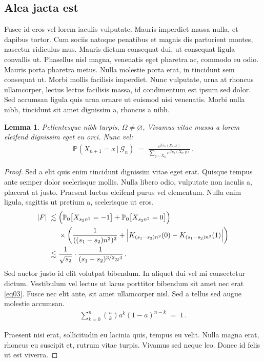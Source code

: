 \documentclass[reqno,final,11pt]{amsart}
\theoremstyle{plain}
\newtheorem{lemma}[theorem]{Lemma}
\theoremstyle{definition}
\theoremstyle{remark}
\begin{document}
\subsection{Alea jacta est}
Fusce id eros vel lorem iaculis vulputate. Mauris imperdiet massa nulla, et dapibus tortor. Cum sociis natoque penatibus et magnis dis parturient montes, nascetur ridiculus mus. Mauris dictum consequat dui, ut consequat ligula convallis ut. Phasellus nisl magna, venenatis eget pharetra ac, commodo eu odio. Mauris porta pharetra metus. Nulla molestie porta erat, in tincidunt sem consequat ut. Morbi mollis facilisis imperdiet. Nunc vulputate, urna at rhoncus ullamcorper, lectus lectus facilisis massa, id condimentum est ipsum sed dolor. Sed accumsan ligula quis urna ornare ut euismod nisi venenatis. Morbi nulla nibh, tincidunt sit amet dignissim a, rhoncus a nibh.
\begin{lemma}\label{lemma1}
 Pellentesque nibh turpis, $\Omega \neq \varnothing$, Vivamus vitae massa a lorem eleifend dignissim eget eu orci.  Nunc vel:
\begin{align*}
\mathbb P(X_{n+1} = x \,|\, \mathcal G_n)\; =\; \frac{e^{\beta \,c_n(X_n, x)}}{
	\sum_{y\sim X_n} e^{\beta \,c_n(X_n, y)}}\,.
\end{align*}
\end{lemma}
\begin{proof}
Sed a elit quis enim tincidunt dignissim vitae eget erat. Quisque tempus ante semper dolor scelerisque mollis. Nulla libero odio, vulputate non iaculis a, placerat at justo. Praesent luctus eleifend purus vel elementum. Nulla enim ligula, sagittis ut pretium a, scelerisque ut eros. 
\begin{align}
|F|\;\lesssim\; &  \Big(\mathbb P_0\big[X_{s_2n^2}=-1\big]+\mathbb P_0\big[X_{s_2n^2}=0\big]\Big) \notag\\
&\times \bigg(\dfrac{1}{((s_1-s_2)n^2)^2}+\Big|K_{(s_1-s_2)n^2}(0)-K_{(s_1-s_2)n^2}(1)\Big|\bigg) \notag \\
\;\lesssim\;&\dfrac{1}{\sqrt{ s_2}}\cdot \dfrac{1}{(s_1-s_2)^{3/2}n^4}\,.\label{eq03}
\end{align}
Sed auctor justo id elit volutpat bibendum. In aliquet dui vel mi consectetur dictum. Vestibulum vel lectus ut lacus porttitor bibendum sit amet nec erat \eqref{eq03}. Fusce nec elit ante, sit amet ullamcorper nisl. Sed a tellus sed augue molestie accumsan.
\begin{align*}
\sum_{k=0}^n\binom{n}{k}a^k{(1-a)}^{n-k}\;=\; 1\,.
\end{align*}

Praesent nisi erat, sollicitudin eu lacinia quis, tempus eu velit. 
Nulla magna erat, rhoncus eu suscipit et, 
rutrum vitae turpis. Vivamus sed neque leo. Donec id felis ut est viverra.
\end{proof}
\end{document}
